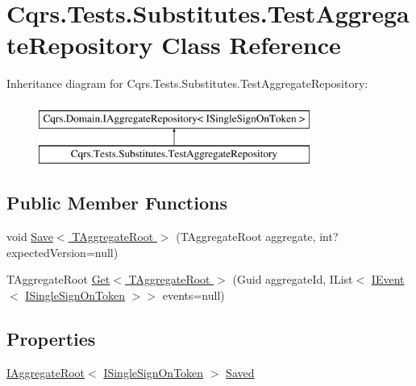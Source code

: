 \hypertarget{classCqrs_1_1Tests_1_1Substitutes_1_1TestAggregateRepository}{}\section{Cqrs.\+Tests.\+Substitutes.\+Test\+Aggregate\+Repository Class Reference}
\label{classCqrs_1_1Tests_1_1Substitutes_1_1TestAggregateRepository}
Inheritance diagram for Cqrs.\+Tests.\+Substitutes.\+Test\+Aggregate\+Repository\+:\begin{figure}[H]
\begin{center}
\leavevmode
\includegraphics[height=2.000000cm]{classCqrs_1_1Tests_1_1Substitutes_1_1TestAggregateRepository}
\end{center}
\end{figure}
\subsection*{Public Member Functions}
\begin{DoxyCompactItemize}
\item 
void \hyperlink{classCqrs_1_1Tests_1_1Substitutes_1_1TestAggregateRepository_aebe99ad9ba8ed487ff5ea04959578ed4_aebe99ad9ba8ed487ff5ea04959578ed4}{Save$<$ T\+Aggregate\+Root $>$} (T\+Aggregate\+Root aggregate, int? expected\+Version=null)
\item 
T\+Aggregate\+Root \hyperlink{classCqrs_1_1Tests_1_1Substitutes_1_1TestAggregateRepository_a7c40bdfb962e659f8555f21f51659c0c_a7c40bdfb962e659f8555f21f51659c0c}{Get$<$ T\+Aggregate\+Root $>$} (Guid aggregate\+Id, I\+List$<$ \hyperlink{interfaceCqrs_1_1Events_1_1IEvent}{I\+Event}$<$ \hyperlink{interfaceCqrs_1_1Authentication_1_1ISingleSignOnToken}{I\+Single\+Sign\+On\+Token} $>$$>$ events=null)
\end{DoxyCompactItemize}
\subsection*{Properties}
\begin{DoxyCompactItemize}
\item 
\hyperlink{interfaceCqrs_1_1Domain_1_1IAggregateRoot}{I\+Aggregate\+Root}$<$ \hyperlink{interfaceCqrs_1_1Authentication_1_1ISingleSignOnToken}{I\+Single\+Sign\+On\+Token} $>$ \hyperlink{classCqrs_1_1Tests_1_1Substitutes_1_1TestAggregateRepository_a5dae460d63c66ee005d2c11eb228388f_a5dae460d63c66ee005d2c11eb228388f}{Saved}
\end{DoxyCompactItemize}


